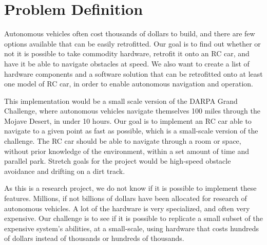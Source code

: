 \documentclass[draftclsnofoot,onecolumn,10pt]{IEEEtran}
\begin{document}
\section{Problem Definition}
Autonomous vehicles often cost thousands of dollars to build, and there are few
options available that can be easily retrofitted. Our goal is to find out whether
or not it is possible to take commodity hardware, retrofit it onto an RC car, and
have it be able to navigate obstacles at speed. We also want to create a list of
hardware components and a software solution that can be retrofitted onto at least
one model of RC car, in order to enable autonomous navigation and operation.\par
This implementation would be a small scale version of the DARPA Grand Challenge,
where autonomous vehicles navigate themselves 100 miles through the Mojave Desert,
in under 10 hours. Our goal is to implement an RC car able to navigate to a given
point as fast as possible, which is a small-scale version of the challenge. The RC
car should be able to navigate through a room or space, without prior knowledge of
the environment, within a set amount of time and parallel park. Stretch goals for
the project would be high-speed obstacle avoidance and drifting on a dirt track.\par
As this is a research project, we do not know if it is possible to implement 
these features. Millions, if not billions of dollars have been allocated for
research of autonomous vehicles. A lot of the hardware is very specialized, and
often very expensive. Our challenge is to see if it is possible to replicate a small
subset of the expensive system's abilities, at a small-scale, using hardware that costs 
hundreds of dollars instead of thousands or hundreds of thousands. 
\end{document}

